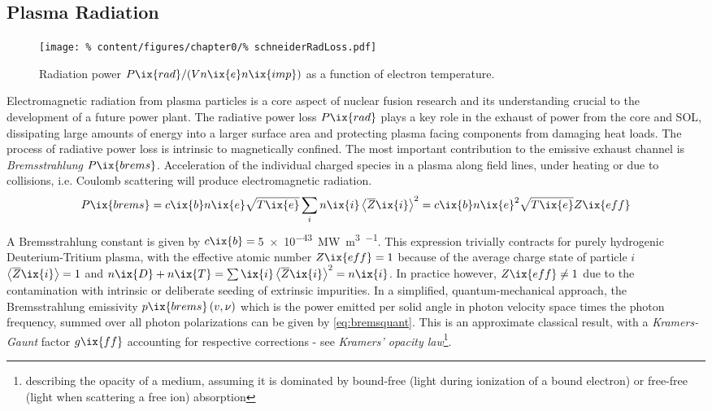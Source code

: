         \subsection{Plasma Radiation}\label{subsec:radiation}%
%
            \begin{figure}[t]%
                \centering%
                \texttt{[image: \%
                    content/figures/chapter0/\%
                    schneiderRadLoss.pdf]}%
                \caption{%
                    Radiation power $P\ix{rad}/(Vn\ix{e}n\ix{imp})$ as a function of electron temperature.\cite{Schneider2006}}\label{fig:radLossCool}%
            \end{figure}%
%
            Electromagnetic radiation from plasma particles is a core aspect of nuclear fusion research and its understanding crucial to the development of a future power plant. The radiative power loss $P\ix{rad}$ plays a key role in the exhaust of power from the core and SOL, dissipating large amounts of energy into a larger surface area and protecting plasma facing components from damaging heat loads. The process of radiative power loss is intrinsic to magnetically confined. The most important contribution to the emissive exhaust channel is \textit{Bremsstrahlung} $P\ix{brems}$. Acceleration of the individual charged species in a plasma along field lines, under heating or due to collisions, i.e. Coulomb scattering will produce electromagnetic radiation.%
%
            \begin{align}%
                P\ix{brems}=c\ix{b}n\ix{e}\sqrt{T\ix{e}}\sum_{i}n\ix{i}\left\langle\overline{Z}\ix{i}\right\rangle^{2}=c\ix{b}n\ix{e}^{2}\sqrt{T\ix{e}}Z\ix{eff}\label{eq:brems}%
            \end{align}%
%
            A Bremsstrahlung constant is given by $c\ix{b}=\,$\SI{5e-43}{\mega\watt\cubic\meter\per\sqrt{\kilo\electronvolt}}\cite{Meade1974}. This expression trivially contracts for purely hydrogenic Deuterium-Tritium plasma, with the effective atomic number $Z\ix{eff}=1$ because of the average charge state of particle $i$ $\left\langle\overline{Z}\ix{i}\right\rangle=1$ and $n\ix{D}+n\ix{T}=\sum\ix{i}\left\langle\overline{Z}\ix{i}\right\rangle^{2}=n\ix{i}$. In practice however, $Z\ix{eff}\neq1$ due to the contamination with intrinsic or deliberate seeding of extrinsic impurities. In a simplified, quantum-mechanical approach, the Bremsstrahlung emissivity $p\ix{brems}\left(v,\nu\right)$ which is the power emitted per solid angle in photon velocity space times the photon frequency, summed over all photon polarizations can be given by \cref{eq:bremsquant}. This is an approximate classical result, with a \textit{Kramers-Gaunt} factor $g\ix{ff}$ accounting for respective corrections - see \textit{Kramers' opacity law}\footnote[1]{describing the opacity of a medium, assuming it is dominated by bound-free (light during ionization of a bound electron) or free-free (light when scattering a free ion) absorption}.%
